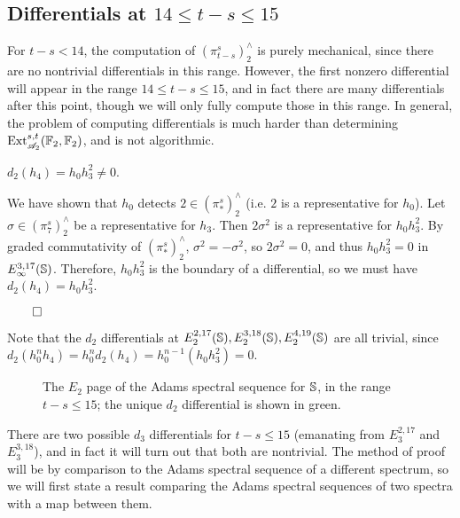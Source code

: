 \documentclass{MetricNotes2023}
\def\bb{\ensuremath\mathbb}
\def\A{\ensuremath{\mathscr{A}_2}}
\DeclareMathOperator{\Ext}{Ext}
\def\done{\begin{flushright}\vspace{-4.35ex}\(\qed\)\end{flushright}}
\begin{document}
\subsection{Differentials at \(14\leq t-s\leq 15\)}\label{2504291253}

For \(t-s<14\), the computation of \((\pi_{t-s}^s)^\wedge_2\) is purely mechanical, since there are no nontrivial differentials in this range.  However, the first nonzero differential will appear in the range \(14\leq t-s\leq15\), and in fact there are many differentials after this point, though we will only fully compute those in this range. In general, the problem of computing differentials is much harder than  determining \(\Ext_{\A}^{s,t}(\bb{F}_2, \bb{F}_2)\), and is not algorithmic. 

\begin{theorem}
\(d_2(h_4)=h_0h_3^2\neq 0\).
\end{theorem}

\begin{ourproof}
We have shown that \(h_0\) detects \(2\in (\pi_*^s)^\wedge_2\) (i.e. \(2\) is a representative for \(h_0\)). Let \(\sigma\in (\pi_7^s)^\wedge_2\) be a representative for \(h_3\). Then \(2 \sigma^2\) is a representative for \(h_0h_3^2\). By graded commutativity of \((\pi_*^s)^\wedge_2\), \(\sigma^2=-\sigma^2\), so \(2 \sigma^2=0\), and thus \(h_0h_3^2=0\) in \(E_\infty^{3,17}(\bb{S})\). Therefore, \(h_0h_3^2\) is the boundary of a differential, so we must have \(d_2(h_4)=h_0h_3^2\).\done
\end{ourproof}

Note that the \(d_2\) differentials at \(E_2^{2, 17}(\bb{S}),  E_2^{3, 18}(\bb{S}), E_2^{4, 19}(\bb{S})\) are all trivial, since \(d_2(h_0^nh_4)=h_0^nd_2(h_4)=h_0^{n-1}(h_0h_3^2)=0\). 

\begin{figure}
\centering

\caption{The \(E_2\) page of the Adams spectral sequence for \(\bb{S}\), in the range \(t-s\leq 15\); the unique \(d_2\) differential is shown in green.}
\label{2504241227}
\end{figure}

There are two possible \(d_3\) differentials for \(t-s\leq 15\) (emanating from \(E_3^{2,17}\) and \(E_3^{3,18}\)), and in fact it will turn out that both are nontrivial. The method of proof will be by comparison to the Adams spectral sequence of a different spectrum, so we will first state a result comparing the Adams spectral sequences of two spectra with a map between them.
\end{document}
